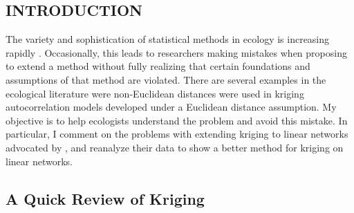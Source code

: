 \documentclass[11pt, titlepage]{article}\usepackage[]{graphicx}\usepackage[]{color}
\begin{document}

\newpage
\begin{spacing}{1.9}
\begin{flushleft}
\setlength{\parindent}{1cm}



\section*{INTRODUCTION}

The variety and sophistication of statistical methods in ecology is increasing rapidly \citep{Touc:McCo:mism:2016}. Occasionally, this leads to researchers making mistakes when proposing to extend a method without fully realizing that certain foundations and assumptions of that method are violated. There are several examples in the ecological literature were non-Euclidean distances were used in kriging autocorrelation models developed under a Euclidean distance assumption. My objective is to help ecologists understand the problem and avoid this mistake.  In particular, I comment on the problems with extending kriging to linear networks advocated by \citet{Ladl:Avga:Whea:Boyc:pred:2016}, and reanalyze their data to show a better method for kriging on linear networks.

\subsection*{A Quick Review of Kriging}


\end{flushleft}
\end{spacing}
\end{document}
